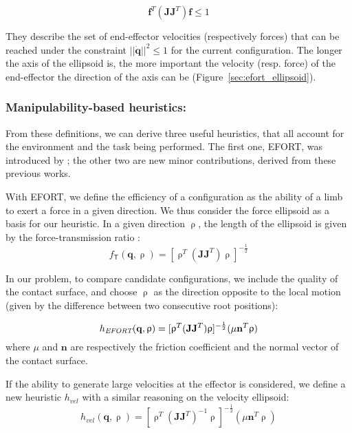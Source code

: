  \begin{equation} 
 \label{eq:for}
\mathbf{f}^T (\mathbf{J}\mathbf{J}^T) \mathbf{f} \leq 1
\end{equation}

They describe the set of end-effector velocities (respectively forces) that can
be reached under the constraint $||\dot{\mathbf{q}}||^2 \leq 1$ for the current configuration.
The longer the axis of the ellipsoid is, the more important the velocity (resp. force) of the end-effector the direction of the axis can be (Figure~\ref{sec:efort_ellipsoid}).
 
\subsubsection{Manipulability-based heuristics:}
From these definitions, we can derive three useful heuristics, that all account for the environment and the task being performed.
The first one, EFORT, was introduced by \cite{Tonneau2014}; the other two are new minor contributions, derived from these previous works.

With EFORT, we define the efficiency of a configuration as the ability of a limb to exert a force in a given direction.
We thus consider the force ellipsoid as a basis for our heuristic.
In a given direction $\uprho$, the length of the ellipsoid is given by the force-transmission ratio \citep{1087795}:
\begin{equation*}
f_\mathsf{T}(\mathbf{q}, \uprho) = [\uprho^{T}(\mathbf{J}\mathbf{J}	^{T})\uprho]^{-\frac{1}{2}}
\end{equation*}

In our problem, to compare candidate configurations, we include the quality of the contact surface, and choose $\uprho$ as the direction
opposite to the local motion (given by the difference between two consecutive root positions):

\begin{equation}
h_{\textrm{\it EFORT}}(\mathbf{q}, \uprho) = [\uprho^{T}(\mathbf{J}\mathbf{J}^T)\uprho]^{-\frac{1}{2}} ( \mu \mathbf{n}^T \uprho)
\end{equation}
where $\mu$ and $\mathbf{n}$ are respectively the friction coefficient and the normal vector of the contact surface.


If the ability to generate large velocities at the effector is considered, we define a new heuristic $h_{vel}$ with a similar reasoning on the velocity ellipsoid:
\begin{equation}
h_{vel}(\mathbf{q}, \uprho) = [\uprho^{T}(\mathbf{J}\mathbf{J}^T)^{-1}\uprho]^{-\frac{1}{2}} ( \mu \mathbf{n}^T \uprho)
\end{equation}

